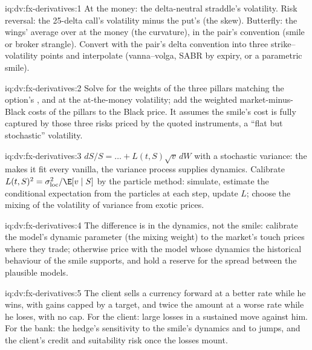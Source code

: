 \begin{solution}{iq:dv:fx-derivatives:1}
At the money: the delta-neutral straddle's volatility. Risk reversal: the 25-delta call's volatility minus the put's (the skew). Butterfly: the wings'
average over at the money (the curvature), in the pair's convention (smile or broker strangle). Convert with the pair's delta convention into three
strike--volatility points and interpolate (vanna--volga, SABR by expiry, or a parametric smile).
\end{solution}

\begin{solution}{iq:dv:fx-derivatives:2}
Solve for the weights of the three pillars matching the option's ,  and  at the at-the-money volatility; add the weighted market-minus-Black
costs of the pillars to the Black price. It assumes the smile's cost is fully captured by those three risks priced by the quoted instruments, a ``flat but
stochastic'' volatility.
\end{solution}

\begin{solution}{iq:dv:fx-derivatives:3}
$dS/S=\dots+L(t,S)\sqrt v\,dW$ with a stochastic variance: the  makes it fit every vanilla, the variance process supplies dynamics.
Calibrate $L(t,S)^2=\sigma_{\mathrm{loc}}^2/\E[v\mid S]$ by the particle method: simulate, estimate the conditional expectation from the particles at each step,
update $L$; choose the mixing of the volatility of variance from exotic prices.
\end{solution}

\begin{solution}{iq:dv:fx-derivatives:4}
The difference is in the dynamics, not the smile: calibrate the model's dynamic parameter (the mixing weight) to the market's touch prices where they trade;
otherwise price with the model whose dynamics the historical behaviour of the smile supports, and hold a reserve for the spread between the plausible
models.
\end{solution}

\begin{solution}{iq:dv:fx-derivatives:5}
The client sells a currency forward at a better rate while he wins, with gains capped by a target, and twice the amount at a worse rate while he loses, with
no cap. For the client: large losses in a sustained move against him. For the bank: the hedge's sensitivity to the smile's dynamics and to jumps, and the
client's credit and suitability risk once the losses mount.
\end{solution}

